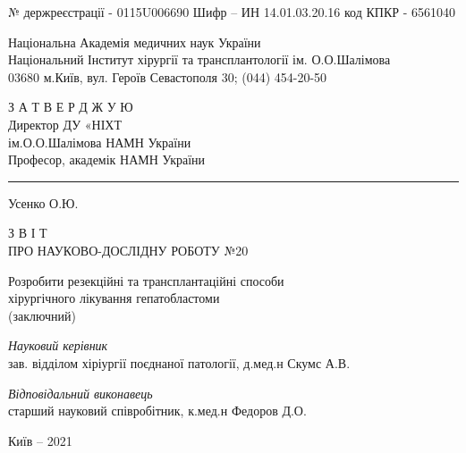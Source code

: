 \thispagestyle{empty}

\noindent № держреєстрації -  0115U006690 \newline
Шифр – ИН 14.01.03.20.16 \newline
код КПКР - 6561040 \newline

\vspace{2em}

\begin{centering}
  \linespread{1.1}
    {Національна Академія медичних наук України \\
     Національний Інститут хірургії та трансплантології ім. О.О.Шалімова \\
     03680 м.Київ, вул. Героїв Севастополя 30; (044) 454-20-50 \\}
\end{centering}

\vspace{2em}

\begin{raggedleft}
    З А Т В Е Р Д Ж У Ю \\
    Директор ДУ «НІХТ \\
    ім.О.О.Шалімова НАМН України \\
    Професор, академік НАМН України \\
    \rule{4cm} {0.15mm} \hspace{0.5cm} Усенко О.Ю. \\
\end{raggedleft} 

\vspace{2em}

\begin{centering}
  \MakeUppercase{ 
    З В І Т \\
    ПРО НАУКОВО-ДОСЛІДНУ РОБОТУ №20\\ }
    
    \vspace{1em}

    {Розробити резекційні та трансплантаційні способи \\
     хірургічного лікування гепатобластоми \\
     (заключний)\\}
\end{centering}

  \vspace{2em}
  


\noindent\textit{Науковий керівник} \\
зав. відділом хіріургії поєднаної патології,
д.мед.н  \hfill Скумс А.В.

\vspace{1em}

\noindent\textit{Відповідальний виконавець} \\
старший науковий співробітник, к.мед.н  \hfill Федоров Д.О.

\vfill

\begin{centering}
  Київ -- 2021 \\
\end{centering}
\afterpage{\blankpage}
